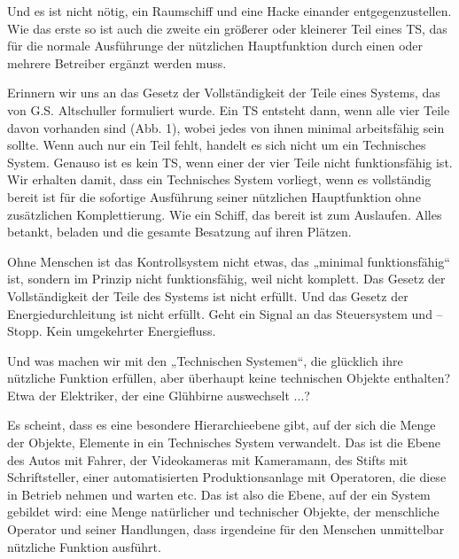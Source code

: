 \documentclass[11pt,a4paper]{article}
\begin{document}
Und es ist nicht nötig, ein Raumschiff und eine Hacke einander
entgegenzustellen. Wie das erste so ist auch die zweite ein größerer oder
kleinerer Teil eines TS, das für die normale Ausführunge der nützlichen
Hauptfunktion durch einen oder mehrere Betreiber ergänzt werden muss.

Erinnern wir uns an das Gesetz der Vollständigkeit der Teile eines Systems,
das von G.S. Altschuller formuliert wurde. Ein TS entsteht dann, wenn alle
vier Teile davon vorhanden sind (Abb. 1), wobei jedes von ihnen minimal
arbeitsfähig sein sollte. Wenn auch nur ein Teil fehlt, handelt es sich nicht
um ein Technisches System. Genauso ist es kein TS, wenn einer der vier Teile
nicht funktionsfähig ist.  Wir erhalten damit, dass ein Technisches System
vorliegt, wenn es vollständig bereit ist für die sofortige Ausführung seiner
nützlichen Hauptfunktion ohne zusätzlichen Komplettierung. Wie ein Schiff, das
bereit ist zum Auslaufen. Alles betankt, beladen und die gesamte Besatzung auf
ihren Plätzen.

Ohne Menschen ist das Kontrollsystem nicht etwas, das „minimal funktionsfähig“
ist, sondern im Prinzip nicht funktionsfähig, weil nicht komplett. Das Gesetz
der Vollständigkeit der Teile des Systems ist nicht erfüllt. Und das Gesetz
der Energiedurchleitung ist nicht erfüllt. Geht ein Signal an das Steuersystem
und -- Stopp. Kein umgekehrter Energiefluss.

Und was machen wir mit den „Technischen Systemen“, die glücklich ihre
nützliche Funktion erfüllen, aber überhaupt keine technischen Objekte
enthalten?  Etwa der Elektriker, der eine Glühbirne auswechselt ...?

Es scheint, dass es eine besondere Hierarchieebene gibt, auf der sich die
Menge der Objekte, Elemente in ein Technisches System verwandelt. Das ist die
Ebene des Autos mit Fahrer, der Videokameras mit Kameramann, des Stifts mit
Schriftsteller, einer automatisierten Produktionsanlage mit Operatoren, die
diese in Betrieb nehmen und warten etc. Das ist also die Ebene, auf der ein
System gebildet wird: eine Menge natürlicher und technischer Objekte, der
menschliche Operator und seiner Handlungen, dass irgendeine für den Menschen
unmittelbar nützliche Funktion ausführt.
\end{document}
